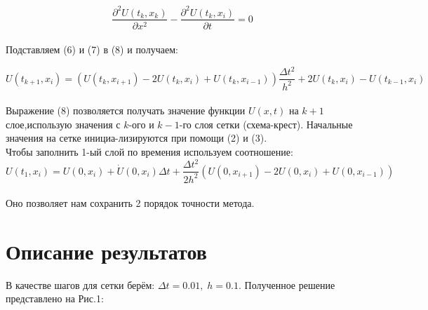 \documentclass[a4paper,fontsize=14pt]{article}
\begin{document}
	\begin{equation}
	\frac{\partial^2 U(t_k, x_k)}{\partial x^2} - \frac{\partial^2 U(t_k, x_i)}{\partial t} = 0
	\end{equation} \\
	
	Подставляем (6) и (7) в (8) и получаем:
	
	\begin{equation}
		U(t_{k+1}, x_i) = (U(t_k, x_{i+1}) - 2U(t_k, x_i) + U(t_k, x_{i-1})) \frac{\Delta t^2}{h^2} + 2U(t_k, x_i) - U(t_{k-1}, x_i)
	\end{equation} \\
	
	Выражение (8) позволяется получать значение функции $U(x, t)$ на $k+1$ слое,использую значения с $k$-ого и $k-1$-го слоя сетки (схема-крест). Начальные значения на сетке инициа-лизируются при помощи (2) и (3).\\
	
	Чтобы заполнить 1-ый слой по времения используем соотношение: \\
	
	\begin{equation}
	U(t_1, x_i) = U(0,x_i) + \dot{U}(0,x_i)\Delta t + \frac{\Delta t^2}{2h^2}(U(0, x_{i+1}) - 2U(0, x_i) + U(0, x_{i-1}))
	\end{equation} \\
	
	Оно позволяет нам сохранить 2 порядок точности метода. 
	
	
	\section{Описание результатов}
	
	В качестве шагов для сетки берём: $\Delta t = 0.01, \; h = 0.1$. Полученное решение представлено на Рис.1: \\
	
	\begin{figure}[h]
		\label{pic1}
		\caption{}
	\end{figure}
	
\end{document}
